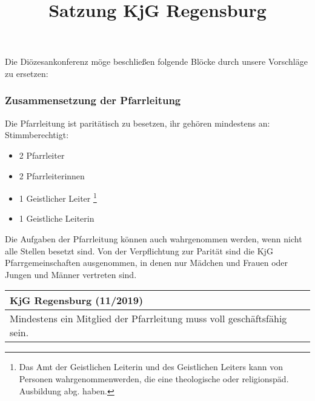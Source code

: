 \documentclass[12pt]{report}
\title{Satzung KjG Regensburg}
\author{}
\newcommand{\footnoteremember}[2]{
  \footnote{#2}
  \newcounter{#1}
  \setcounter{#1}{\value{footnote}}
}
\newcommand{\footnoterecall}[1]{%
  \footnotemark[\value{#1}]
}
\newcounter{tablecounter}
\newcommand\showcounter{\addtocounter{tablecounter}{1}\thetablecounter}
\begin{document}
\begin{flushleft}

Die Diözesankonferenz möge beschließen folgende Blöcke durch unsere Vorschläge zu ersetzen:


\subsubsection{Zusammensetzung der Pfarrleitung}

Die Pfarrleitung ist paritätisch zu besetzen, ihr gehören mindestens an:
Stimmberechtigt:
\begin{itemize}
  \item 2 Pfarrleiter
  \item 2 Pfarrleiterinnen
  \item 1 Geistlicher Leiter \footnoteremember{Berechtigung Geist}{
    Das Amt der Geistlichen Leiterin und des Geistlichen Leiters kann von Personen wahrgenommenwerden,
    die eine theologische oder religionspäd. Ausbildung abg. haben.
  }
  \item 1 Geistliche Leiterin \footnoterecall{Berechtigung Geist}
\end{itemize}
Die Aufgaben der Pfarrleitung können auch wahrgenommen werden, wenn nicht alle Stellen besetzt sind.
Von der Verpflichtung zur Parität sind die KjG Pfarrgemeinschaften ausgenommen, in
denen nur Mädchen und Frauen oder Jungen und Männer vertreten sind.

\begin{table}[H]
 \begin{tabular}{|l|}
  \hline
  \rowcolor[HTML]{FFCC67} 
  \rule[-1ex]{0pt}{4ex} \textbf{KjG Regensburg (11/2019)}     \hspace{0.6\textwidth} \showcounter        \\ \hline
  \rule[-1ex]{0pt}{4ex} \begin{minipage}[t]{\textwidth} 
   Mindestens ein Mitglied der Pfarrleitung muss voll geschäftsfähig sein.
   \rule[-1.2ex]{0pt}{0pt}
  \end{minipage}
  

\end{tabular}
\end{table}
\end{flushleft}
\end{document}
